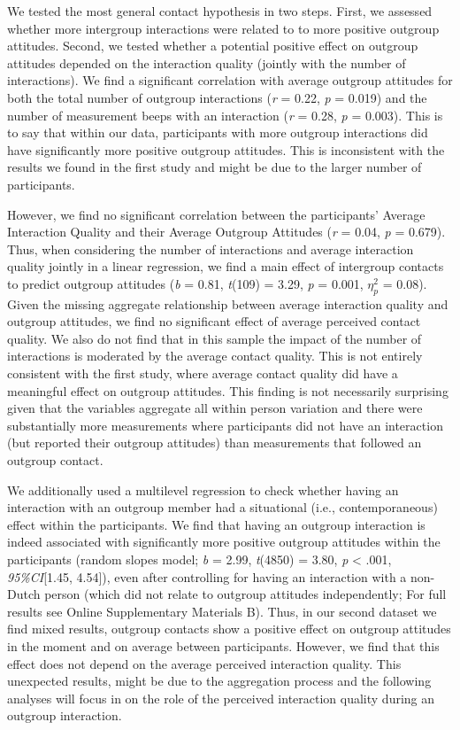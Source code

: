 We tested the most general contact hypothesis in two steps. First, we
assessed whether more intergroup interactions were related to to more
positive outgroup attitudes. Second, we tested whether a potential
positive effect on outgroup attitudes depended on the interaction
quality (jointly with the number of interactions). We find a significant
correlation with average outgroup attitudes for both the total number of
outgroup interactions (\textit{r} = 0.22, \textit{p} = 0.019) and the
number of measurement beeps with an interaction (\textit{r} = 0.28,
\textit{p} = 0.003). This is to say that within our data, participants
with more outgroup interactions did have significantly more positive
outgroup attitudes. This is inconsistent with the results we found in
the first study and might be due to the larger number of participants.

However, we find no significant correlation between the participants'
Average Interaction Quality and their Average Outgroup Attitudes
(\textit{r} = 0.04, \textit{p} = 0.679). Thus, when considering the
number of interactions and average interaction quality jointly in a
linear regression, we find a main effect of intergroup contacts to
predict outgroup attitudes (\textit{b} = 0.81, \textit{t}(109) = 3.29,
\textit{p} = 0.001, \(\eta_p^2\) = 0.08). Given the missing aggregate
relationship between average interaction quality and outgroup attitudes,
we find no significant effect of average perceived contact quality. We
also do not find that in this sample the impact of the number of
interactions is moderated by the average contact quality. This is not
entirely consistent with the first study, where average contact quality
did have a meaningful effect on outgroup attitudes. This finding is not
necessarily surprising given that the variables aggregate all within
person variation and there were substantially more measurements where
participants did not have an interaction (but reported their outgroup
attitudes) than measurements that followed an outgroup contact.

We additionally used a multilevel regression to check whether having an
interaction with an outgroup member had a situational (i.e.,
contemporaneous) effect within the participants. We find that having an
outgroup interaction is indeed associated with significantly more
positive outgroup attitudes within the participants (random slopes
model; \textit{b} = 2.99, \textit{t}(4850) = 3.80, \textit{p}
\textless{} .001, \textit{95\%CI}{[}1.45, 4.54{]}), even after
controlling for having an interaction with a non-Dutch person (which did
not relate to outgroup attitudes independently; For full results see
Online Supplementary Materials B). Thus, in our second dataset we find
mixed results, outgroup contacts show a positive effect on outgroup
attitudes in the moment and on average between participants. However, we
find that this effect does not depend on the average perceived
interaction quality. This unexpected results, might be due to the
aggregation process and the following analyses will focus in on the role
of the perceived interaction quality during an outgroup interaction.

